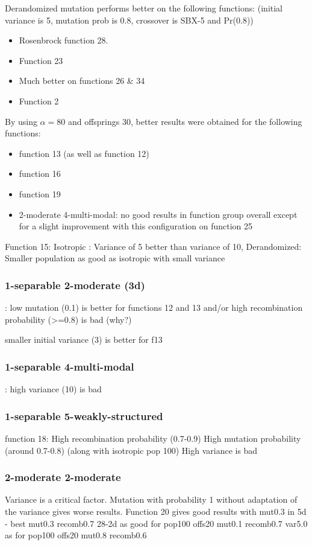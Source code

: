 

Derandomized mutation performs better on the following functions: (initial variance is 5, mutation prob is 0.8, crossover is  SBX-5 and Pr(0.8))
\begin{itemize}
\item Rosenbrock function 28.
\item Function 23
\item Much better on functions 26 \& 34
\item Function 2
\end{itemize}
By using $\alpha = 80$ and offsprings 30, better results were obtained for the following functions:
\begin{itemize}
\item function 13 (as well as function 12)
\item function 16
\item function 19
\item 2-moderate 4-multi-modal:  no good results in function group overall except for a slight improvement with this configuration on function 25
\end{itemize}

Function 15: Isotropic : Variance of 5 better than variance of 10, 
			 Derandomized: Smaller population as good as isotropic with small variance
			 
\subsubsection*{1-separable 2-moderate (3d)}: 
low mutation (0.1) is better for functions 12 and 13 and/or high recombination probability (>=0.8) is bad (why?)

smaller initial variance (3) is better for f13

\subsubsection*{1-separable 4-multi-modal} : high variance (10) is bad

\subsubsection*{1-separable 5-weakly-structured}
function 18: High recombination probability (0.7-0.9)
			  High mutation probability (around 0.7-0.8)  (along with isotropic pop 100)
			  High variance is bad

\subsubsection*{2-moderate 2-moderate}
Variance is a critical factor. 
Mutation with probability 1 without adaptation of the variance gives worse results.
Function 20 gives good results with mut0.3 in 5d - best mut0.3 recomb0.7 
28-2d as good for pop100 offs20 mut0.1 recomb0.7 var5.0 as for pop100 offs20 mut0.8 recomb0.6

